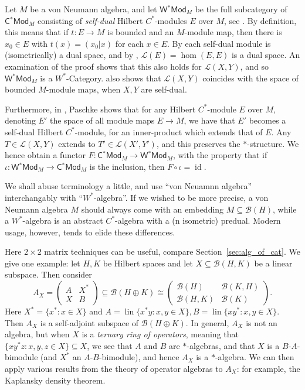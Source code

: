 \documentclass[a4paper,11pt]{article}
\theoremstyle{plain}
\theoremstyle{remark}
\newenvironment{example}
  {\pushQED{\qed}\renewcommand{\qedsymbol}{$\triangle$}\examplex}
  {\popQED\endexamplex}
\newcommand{\mc}[1]{\mathcal{#1}}
\newcommand{\lin}{\operatorname{lin}}
\newcommand{\id}{\operatorname{id}}
\newcommand{\catHCStar}[1]{\textsf{C$^*$Mod}_{#1}}
\newcommand{\catHWStar}[1]{\textsf{W$^*$Mod}_{#1}}
\begin{document}
\begin{example}
Let $M$ be a von Neumann algebra, and let $\catHWStar{M}$ be the full subcategory of $\catHCStar{M}$ consisting of \emph{self-dual} Hilbert $C^*$-modules $E$ over $M$, see \cite{paschke_inner_prod_mods}.  By definition, this means that if $t\colon E \to M$ is bounded and an $M$-module map, then there is $x_0\in E$ with $t(x) = (x_0|x)$ for each $x\in E$.  By \cite[Proposition~3.8]{paschke_inner_prod_mods} each self-dual module is (isometrically) a dual space, and by \cite[Proposition~3.10]{paschke_inner_prod_mods}, $\mc L(E) = \hom(E,E)$ is a dual space.  An examination of the proof shows that this also holds for $\mc L(X,Y)$, and so $\catHWStar{M}$ is a $W^*$-Category.  \cite[Proposition~3.4]{paschke_inner_prod_mods} also shows that $\mc L(X,Y)$ coincides with the space of bounded $M$-module maps, when $X,Y$ are self-dual.

Furthermore, in \cite[Section~3]{paschke_inner_prod_mods}, Paschke shows that for any Hilbert $C^*$-module $E$ over $M$, denoting $E'$ the space of all module maps $E\to M$, we have that $E'$ becomes a self-dual Hilbert $C^*$-module, for an inner-product which extends that of $E$.  Any $T\in\mc L(X,Y)$ extends to $T'\in\mc L(X',Y')$, and this preserves the $*$-structure.  We hence obtain a functor $F \colon \catHCStar{M} \to \catHWStar{M}$, with the property that if $\iota \colon \catHWStar{M} \to \catHCStar{M}$ is the inclusion, then $F \circ \iota = \id$.
\end{example}

We shall abuse terminology a little, and use ``von Neuamnn algebra'' interchangably with ``$W^*$-algebra''.  If we wished to be more precise, a von Neumann algebra $M$ should always come with an embedding $M\subseteq\mc B(H)$, while a $W^*$-algebra is an abstract $C^*$-algebra with a (n isometric) predual.  Modern usage, however, tends to elide these differences.

Here $2\times 2$ matrix techniques can be useful, compare Section~\ref{sec:alg_of_cat}.  We give one example: let $H,K$ be Hilbert spaces and let $X\subseteq \mc B(H,K)$ be a linear subspace.  Then consider
\[ A_X = \begin{pmatrix} A & X^* \\ X & B \end{pmatrix} \subseteq \mc B(H \oplus K) \cong
\begin{pmatrix} \mc B(H) & \mc B(K,H)  \\  \mc B(H,K) & \mc B(K) \end{pmatrix}. \]
Here $X^*=\{x^*:x\in X\}$ and $A=\lin\{ x^*y : x,y\in X\}, B=\lin\{xy^* : x,y\in X \}$.  Then $A_X$ is a self-adjoint subspace of $\mc B(H\oplus K)$.  In general, $A_X$ is not an algebra, but when $X$ is a \emph{ternary ring of operators}, meaning that $\{ xy^*z: x,y,z\in X\}\subseteq X$, we see that $A$ and $B$ are $*$-algebras, and that $X$ is a $B$-$A$-bimodule (and $X^*$ an $A$-$B$-bimodule), and hence $A_X$ is a $*$-algebra.  We can then apply various results from the theory of operator algebras to $A_X$: for example, the Kaplansky density theorem.
\end{document}
